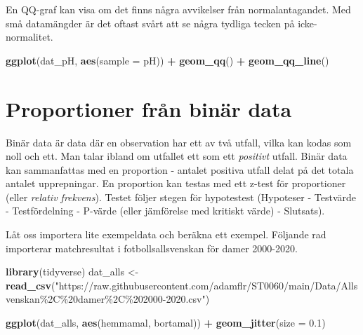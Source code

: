 \documentclass[
]{book}
\newenvironment{Shaded}{\begin{snugshade}}{\end{snugshade}}
\newcommand{\AttributeTok}[1]{\textcolor[rgb]{0.13,0.29,0.53}{#1}}
\newcommand{\FloatTok}[1]{\textcolor[rgb]{0.00,0.00,0.81}{#1}}
\newcommand{\FunctionTok}[1]{\textcolor[rgb]{0.13,0.29,0.53}{\textbf{#1}}}
\newcommand{\NormalTok}[1]{#1}
\newcommand{\OtherTok}[1]{\textcolor[rgb]{0.56,0.35,0.01}{#1}}
\newcommand{\SpecialCharTok}[1]{\textcolor[rgb]{0.81,0.36,0.00}{\textbf{#1}}}
\newcommand{\StringTok}[1]{\textcolor[rgb]{0.31,0.60,0.02}{#1}}
\theoremstyle{definition}
\theoremstyle{definition}
\theoremstyle{definition}
\theoremstyle{definition}
\theoremstyle{remark}
\begin{document}
En QQ-graf kan visa om det finns några avvikelser från normalantagandet. Med små datamängder är det oftast svårt att se några tydliga tecken på icke-normalitet.

\begin{Shaded}
\begin{Highlighting}[]
\FunctionTok{ggplot}\NormalTok{(dat\_pH, }\FunctionTok{aes}\NormalTok{(}\AttributeTok{sample =}\NormalTok{ pH)) }\SpecialCharTok{+}
  \FunctionTok{geom\_qq}\NormalTok{() }\SpecialCharTok{+}
  \FunctionTok{geom\_qq\_line}\NormalTok{()}
\end{Highlighting}
\end{Shaded}

\section{Proportioner från binär data}\label{proportioner-fruxe5n-binuxe4r-data}

Binär data är data där en observation har ett av två utfall, vilka kan kodas som noll och ett. Man talar ibland om utfallet ett som ett \emph{positivt} utfall. Binär data kan sammanfattas med en proportion - antalet positiva utfall delat på det totala antalet upprepningar. En proportion kan testas med ett z-test för proportioner (eller \emph{relativ frekvens}). Testet följer stegen för hypotestest (Hypoteser - Testvärde - Testfördelning - P-värde (eller jämförelse med kritiskt värde) - Slutsats).

Låt oss importera lite exempeldata och beräkna ett exempel. Följande rad importerar matchresultat i fotbollsallsvenskan för damer 2000-2020.

\begin{Shaded}
\begin{Highlighting}[]
\FunctionTok{library}\NormalTok{(tidyverse)}
\NormalTok{dat\_alls }\OtherTok{\textless{}{-}} \FunctionTok{read\_csv}\NormalTok{(}\StringTok{"https://raw.githubusercontent.com/adamflr/ST0060/main/Data/Allsvenskan\%2C\%20damer\%2C\%202000{-}2020.csv"}\NormalTok{)}

\FunctionTok{ggplot}\NormalTok{(dat\_alls, }\FunctionTok{aes}\NormalTok{(hemmamal, bortamal)) }\SpecialCharTok{+}
  \FunctionTok{geom\_jitter}\NormalTok{(}\AttributeTok{size =} \FloatTok{0.1}\NormalTok{)}
\end{Highlighting}
\end{Shaded}
\end{document}
